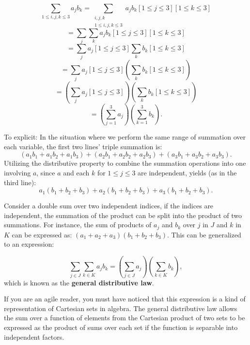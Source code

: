 \begin{example}
    \[
\sum_{1 \leq i,j,k \leq 3} a_j b_k = \sum_{\substack{i,j,k \\ 1 \leq i,j,k \leq 3}} a_j b_k \left[1 \leq j \leq 3\right] \left[1 \leq k \leq 3\right]
\]
\[
= \sum_j \sum_k a_j b_k \left[1 \leq j \leq 3\right] \left[1 \leq k \leq 3\right]
\]
\[
= \sum_j a_j \left[1 \leq j \leq 3\right] \sum_k b_k \left[1 \leq k \leq 3\right]
\]
\[
= \sum_j a_j \left[1 \leq j \leq 3\right] \left( \sum_k b_k \left[1 \leq k \leq 3\right] \right)
\]
\[
= \left( \sum_j a_j \left[1 \leq j \leq 3\right] \right) \left( \sum_k b_k \left[1 \leq k \leq 3\right] \right)
\]
\[
= \left( \sum_{j=1}^3 a_j \right) \left( \sum_{k=1}^3 b_k \right).
    \]

\end{example}
To explicit:
In the situation where we perform the same range of summation over each variable, the first two lines' triple summation is:
\[
(a_1b_1 + a_1b_2 + a_1b_3) + (a_2b_1 + a_2b_2 + a_2b_3) + (a_3b_1 + a_3b_2 + a_3b_3).
\]
Utilizing the distributive property to combine the summation operations into one involving \( a \), since \( a \) and each \( k \) for \( 1 \leq j \leq 3 \) are independent, yields (as in the third line):
\[
a_1(b_1 + b_2 + b_3) + a_2(b_1 + b_2 + b_3) + a_3(b_1 + b_2 + b_3).
\]

Consider a double sum over two independent indices, if the indices are independent, the summation of the product can be split into the product of two summations. For instance, the sum of products of \(a_j\) and \(b_k\) over \(j\) in \(J\) and \(k\) in \(K\) can be expressed as: \( (a_1 + a_2 + a_3)(b_1 + b_2 + b_3) \). This can be generalized to an expression:

\begin{equation}
\sum_{j \in J} \sum_{k \in K} a_j b_k = \left( \sum_{j \in J} a_j \right) \left( \sum_{k \in K} b_k \right),
\end{equation}
which is known as the \textbf{general distributive law}.
\begin{remark}
    If you are an agile reader, you must have noticed that this expression is a kind of representation of Cartesian sets in algebra. The general distributive law allows the sum over a function of elements from the Cartesian product of two sets to be expressed as the product of sums over each set if the function is separable into independent factors.
\end{remark}
